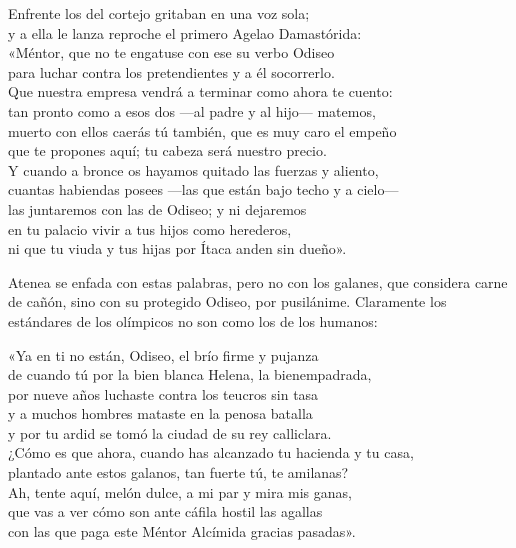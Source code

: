 \begin{versocita}
Enfrente los del cortejo gritaban en una voz sola;\\
y a ella le lanza reproche el primero Agelao Damastórida:\\
«Méntor, que no te engatuse con ese su verbo Odiseo\\
para luchar contra los pretendientes y a él socorrerlo.\\
Que nuestra empresa vendrá a terminar como ahora te cuento:\\
tan pronto como a esos dos ---al padre y al hijo--- matemos,\\
muerto con ellos caerás tú también, que es muy caro el empeño\\
que te propones aquí; tu cabeza será nuestro precio.\\
Y cuando a bronce os hayamos quitado las fuerzas y aliento,\\
cuantas habiendas posees ---las que están bajo techo y a cielo---\\
las juntaremos con las de Odiseo; y ni dejaremos\\
en tu palacio vivir a tus hijos como herederos,\\
ni que tu viuda y tus hijas por Ítaca anden sin dueño».
\end{versocita}

Atenea se enfada con estas palabras, pero no con los galanes, que considera carne de cañón, sino con su protegido Odiseo, por pusilánime. Claramente los estándares de los olímpicos no son como los de los humanos:

\begin{versocita}
«Ya en ti no están, Odiseo, el brío firme y pujanza\\
de cuando tú por la bien blanca Helena, la bienempadrada,\\
por nueve años luchaste contra los teucros sin tasa\\
y a muchos hombres mataste en la penosa batalla\\
y por tu ardid se tomó la ciudad de su rey calliclara.\\
¿Cómo es que ahora, cuando has alcanzado tu hacienda y tu casa,\\
plantado ante estos galanos, tan fuerte tú, te amilanas?\\
Ah, tente aquí, melón dulce, a mi par y mira mis ganas,\\
que vas a ver cómo son ante cáfila hostil las agallas\\
con las que paga este Méntor Alcímida gracias pasadas».
\end{versocita}

